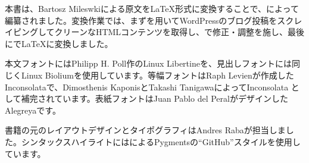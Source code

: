本書は、Bartosz Mileswkiによる原文を\LaTeX{}形式に変換することで、によって編纂されました。変換作業では、まずを用いてWordPressのブログ投稿をスクレイピングしてクリーンなHTMLコンテンツを取得し、で修正・調整を施し、最後にで\LaTeX{}に変換しました。

本文フォントにはPhilipp H. Poll作のLinux Libertineを、見出しフォントには同じくLinux Bioliumを使用しています。等幅フォントはRaph Levienが作成したInconsolataで、Dimosthenis KaponisとTakashi TanigawaによってInconsolata として補完されています。表紙フォントはJuan Pablo del Peralがデザインした Alegreyaです。

書籍の元のレイアウトデザインとタイポグラフィはAndres Rabaが担当しました。シンタックスハイライトにはによるPygmentsの``GitHub''スタイルを使用しています。
\ifdefined\OPTCustomLanguage{%
    
  }
\fi
